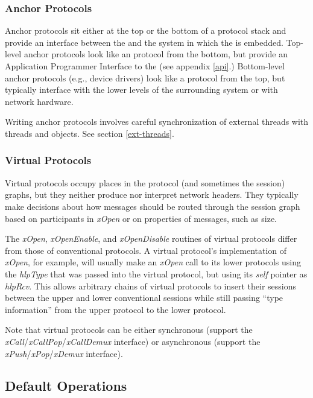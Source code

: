 \subsubsection{Anchor Protocols}

Anchor protocols sit either at the top or the bottom of a protocol
stack and provide an interface between the \xk{} and the system in
which the \xk{} is embedded.  Top-level anchor protocols look like an
\xk{} protocol from the bottom, but provide an Application Programmer
Interface to the \xk{} (see appendix \ref{api}.)  Bottom-level anchor
protocols (e.g., device drivers) look like a protocol from the top,
but typically interface with the lower levels of the surrounding
system or with network hardware.

Writing anchor protocols involves careful synchronization of
external threads with \xk{} threads and objects.  See section
\ref{ext-threads}. 

\subsubsection{Virtual Protocols}

Virtual protocols occupy places in the protocol (and sometimes the
session) graphs, but they neither produce nor interpret network headers.
They typically make decisions about how messages should be routed
through the session graph based on participants in {\em xOpen} or on
properties of messages, such as size.

The {\em xOpen}, {\em xOpenEnable}, and {\em xOpenDisable} routines of
virtual protocols differ from those of conventional protocols.  A
virtual protocol's implementation of {\em xOpen}, for example, will
usually make an {\em xOpen} call to its lower protocols using the {\em
hlpType} that was passed into the virtual protocol, but using its {\em
self} pointer as {\em hlpRcv}.  This allows arbitrary chains of
virtual protocols to insert their sessions between the upper and lower
conventional sessions while still passing ``type information'' from
the upper protocol to the lower protocol.

Note that virtual protocols can be either synchronous (support the
{\em xCall}/{\em xCallPop}/{\em xCallDemux} interface) or asynchronous
(support the {\em xPush}/{\em xPop}/{\em xDemux} interface).


\subsection{Default Operations}

